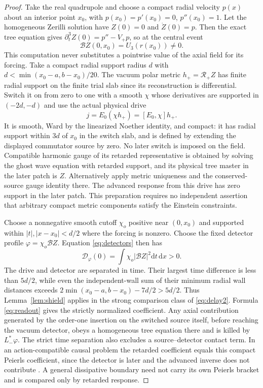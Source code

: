 \documentclass[11pt]{article}
\newcommand{\dd}{\mathrm d}
\begin{document}
\begin{proof}
Take the real quadrupole and choose a compact radial velocity $p(x)$ about an interior point $x_0$, with $p(x_0)=p'(x_0)=0$, $p''(x_0)=1$. Let the homogeneous Zerilli solution have $Z(0)=0$ and $\dot Z(0)=p$. Then the exact tree equation gives $\partial_t^3 Z(0)=p''-V_+p$, so at the central event
\[
 \mathcal B Z(0,x_0)=U_3(r(x_0))\ne0 .
\]
This computation never substitutes a pointwise value of the axial field for its forcing. Take a compact radial support radius $d$ with $d<\min(x_0-a,b-x_0)/20$. The vacuum polar metric $h_+=\mathcal R_+Z$ has finite radial support on the finite trial slab since its reconstruction is differential. Switch it on from zero to one with a smooth $\chi$ whose derivatives are supported in $(-2d,-d)$ and use the actual physical drive
\begin{equation}\label{eq:source}
 j=E_0(\chi h_+)=[E_0,\chi]h_+ .
\end{equation}
It is smooth, Ward by the linearized Noether identity, and compact: it has radial support within $3d$ of $x_0$ in the switch slab, and is defined by extending the displayed commutator source by zero. No later switch is imposed on the field. Compatible harmonic gauge of its retarded representative is obtained by solving the ghost wave equation with retarded support, and its physical tree master in the later patch is $Z$. Alternatively apply metric uniqueness and the conserved-source gauge identity there. The advanced response from this drive has zero support in the later patch. This preparation requires no independent assertion that arbitrary compact metric components satisfy the Einstein constraints.

Choose a nonnegative smooth cutoff $\chi_o$ positive near $(0,x_0)$ and supported within $|t|,|x-x_0|<d/2$ where the forcing is nonzero. Choose the fixed detector profile $\varphi=\chi_o\mathcal B Z$. Equation \eqref{eq:detectors} then has
\[
 \mathcal D_\varphi(0)=\int\chi_o|\mathcal B Z|^2\dd t\,\dd x>0 .
\]
The drive and detector are separated in time. Their largest time difference is less than $5d/2$, while even the independent-wall sum of their minimum radial wall distances exceeds $2\min(x_0-a,b-x_0)-7d/2>5d/2$. Thus Lemma~\ref{lem:shield} applies in the strong comparison class of \eqref{eq:delay2}. Formula \eqref{eq:readout} gives the strictly normalized coefficient. Any axial contribution generated by the order-one insertion on the switched source itself, before reaching the vacuum detector, obeys a homogeneous tree equation there and is killed by $L_-^*\varphi$. The strict time separation also excludes a source--detector contact term. In an action-compatible causal problem the retarded coefficient equals this compact Peierls coefficient, since the detector is later and the advanced inverse does not contribute \cite{P27,Khavkine}. A general dissipative boundary need not carry its own Peierls bracket and is compared only by retarded response.
\end{proof}
\end{document}
